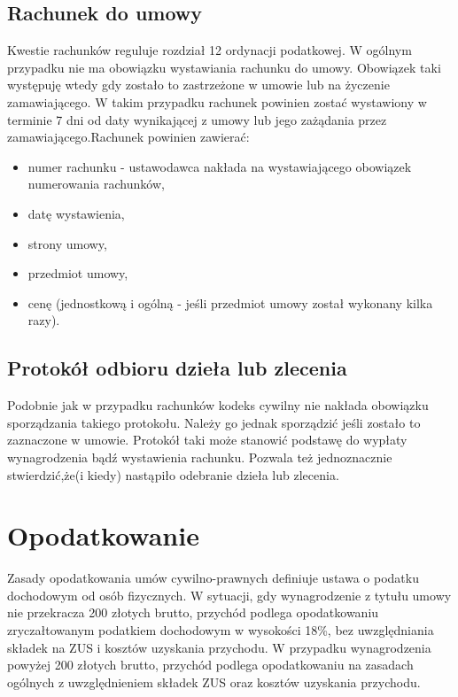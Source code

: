 \subsection[Rachunek do umowy][Rachunek do umowy]{Rachunek do umowy}
Kwestie rachunków reguluje rozdział 12 ordynacji podatkowej\cite{TODO}. W ogólnym przypadku nie ma obowiązku wystawiania rachunku do umowy. Obowiązek taki występuję wtedy gdy zostało to zastrzeżone w umowie lub na życzenie zamawiającego. W takim przypadku rachunek powinien zostać wystawiony w terminie 7 dni od daty wynikającej z umowy lub jego zażądania przez zamawiającego.Rachunek powinien zawierać:
\begin{itemize}
\item numer rachunku - ustawodawca nakłada na wystawiającego obowiązek numerowania rachunków,
\item datę wystawienia,
\item strony umowy,
\item przedmiot umowy,
\item cenę (jednostkową i ogólną - jeśli przedmiot umowy został wykonany kilka razy).
\end{itemize}

\subsection[Protokół odbioru dzieła lub zlecenia][Protokół odbioru dzieła lub zlecenia]{Protokół odbioru dzieła lub zlecenia}
Podobnie jak w przypadku rachunków kodeks cywilny nie nakłada obowiązku sporządzania takiego protokołu. Należy go jednak sporządzić jeśli zostało to zaznaczone w umowie. Protokół taki może stanowić podstawę do wypłaty wynagrodzenia bądź wystawienia rachunku. Pozwala też jednoznacznie stwierdzić,że(i kiedy) nastąpiło odebranie dzieła lub zlecenia.

\section[Opodatkowanie][Opodatkowanie]{Opodatkowanie}
Zasady opodatkowania umów cywilno-prawnych definiuje ustawa o podatku dochodowym od osób fizycznych\cite{TODO}. W sytuacji, gdy wynagrodzenie z tytułu umowy nie przekracza 200 złotych brutto, przychód podlega opodatkowaniu zryczałtowanym podatkiem dochodowym w wysokości 18\%, bez uwzględniania składek na ZUS i kosztów uzyskania przychodu.
W przypadku wynagrodzenia powyżej 200 złotych brutto, przychód podlega opodatkowaniu na zasadach ogólnych z uwzględnieniem składek ZUS oraz kosztów uzyskania przychodu.

